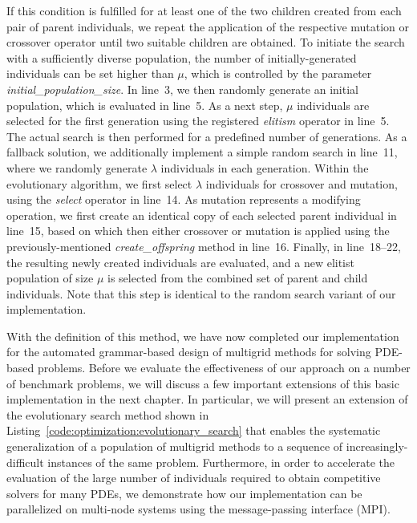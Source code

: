 If this condition is fulfilled for at least one of the two children created from each pair of parent individuals, we repeat the application of the respective mutation or crossover operator until two suitable children are obtained.
To initiate the search with a sufficiently diverse population, the number of initially-generated individuals can be set higher than $\mu$, which is controlled by the parameter \emph{initial\_population\_size}.
In line~3, we then randomly generate an initial population, which is evaluated in line~5.
As a next step, $\mu$ individuals are selected for the first generation using the registered \emph{elitism} operator in line~5.
The actual search is then performed for a predefined number of generations.
As a fallback solution, we additionally implement a simple random search in line~11, where we randomly generate $\lambda$ individuals in each generation.
Within the evolutionary algorithm, we first select $\lambda$ individuals for crossover and mutation, using the \emph{select} operator in line~14.
As mutation represents a modifying operation, we first create an identical copy of each selected parent individual in line~15, based on which then either crossover or mutation is applied using the previously-mentioned \emph{create\_offspring} method in line~16.
Finally, in line~18--22, the resulting newly created individuals are evaluated, and a new elitist population of size $\mu$ is selected from the combined set of parent and child individuals.
Note that this step is identical to the random search variant of our implementation.

With the definition of this method, we have now completed our implementation for the automated grammar-based design of multigrid methods for solving PDE-based problems.
Before we evaluate the effectiveness of our approach on a number of benchmark problems, we will discuss a few important extensions of this basic implementation in the next chapter.
In particular, we will present an extension of the evolutionary search method shown in Listing~\ref{code:optimization:evolutionary_search} that enables the systematic generalization of a population of multigrid methods to a sequence of increasingly-difficult instances of the same problem.
Furthermore, in order to accelerate the evaluation of the large number of individuals required to obtain competitive solvers for many PDEs, we demonstrate how our implementation can be parallelized on multi-node systems using the message-passing interface (MPI).
